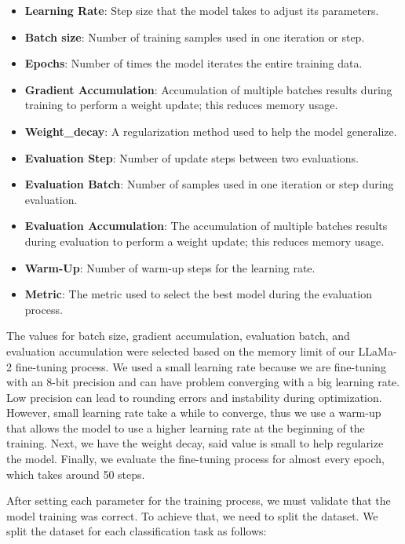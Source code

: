 \begin{itemize}
\item{\textbf{Learning Rate}}: Step size that the model takes to adjust its parameters.
\item{\textbf{Batch size}}: Number of training samples used in one iteration or step.
\item{\textbf{Epochs}}: Number of times the model iterates the entire training data.
\item{\textbf{Gradient Accumulation}}: Accumulation of multiple batches results during training to perform a weight update; this reduces memory usage.
\item{\textbf{Weight\_decay}}: A regularization method used to help the model generalize.
\item{\textbf{Evaluation Step}}: Number of update steps between two evaluations.
\item{\textbf{Evaluation Batch}}: Number of samples used in one iteration or step during evaluation.
\item{\textbf{Evaluation Accumulation}}: The accumulation of multiple batches results during evaluation to perform a weight update; this reduces memory usage.
\item{\textbf{Warm-Up}}: Number of warm-up steps for the learning rate.
\item{\textbf{Metric}}: The metric used to select the best model during the evaluation process.

\end{itemize}

\noindent The values for batch size, gradient accumulation, evaluation batch, and evaluation accumulation were selected based on the memory limit of our LLaMa-2 fine-tuning process. We used a small learning rate because we are fine-tuning with an 8-bit precision and can have problem converging with a big learning rate. Low precision can lead to rounding errors and instability during optimization. However, small learning rate take a while to converge, thus we use a warm-up that allows the model to use a higher learning rate at the beginning of the training. Next, we have the weight decay, said value is small to help regularize the model. Finally, we evaluate the fine-tuning process for almost every epoch, which takes around 50 steps.

After setting each parameter for the training process, we must validate that the model training was correct. To achieve that, we need to split the dataset. We split the dataset for each classification task as follows: 

